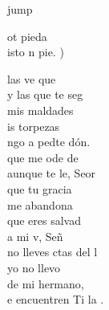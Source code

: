 \begin{cancion}jump\\
	\begin{chorus}%
		ot pieda\\
		isto n pie. )\jump\\
	\end{chorus}%
	 las ve que \\
	y las que te seg  \\
	 mis maldades\\
	is torpezas\\
	ngo a pedte dón. \\
	\jump
	que me ode de  \\
	aunque te le, Seor \\
	 que tu gracia\\
	me abandona\\
	 que eres  salvad  \\
	\jump
	a mi v, Señ\\
	no lleves ctas del l  \\
	 yo no llevo\\
	 de mi hermano,\\
	e encuentren Ti la .   \\
\end{cancion}%
